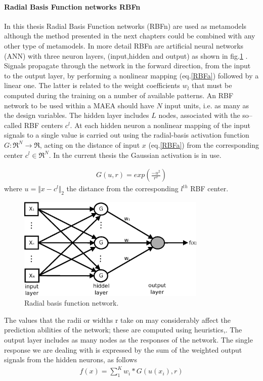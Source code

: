 \paragraph{Radial Basis Function networks RBFn}
In this thesis Radial Basis Function networks (RBFn) are used as metamodels although the method presented in the next chapters could be combined with any other type of metamodels. In more detail RBFn are artificial neural networks (ANN) with three neuron layers, (input,hidden and output) as shown in fig.\ref{rbf1} \cite{Haykin}. Signals propagate through the network in the forward direction, from the input to the output layer, by performing a nonlinear mapping (eq.\ref{RBFa}) followed by a linear one. The latter is related to the weight coefficients $w_l$ that must be computed during the training on a number of available patterns. An RBF network to be used within a MAEA should have $N$ input units, i.e. as many as the  design variables. The hidden layer includes $L$ nodes, associated with the so–called RBF centers $c^l$. At each hidden neuron a nonlinear mapping of the input signals to a single value is carried out using the radial-basis activation function $G:\Re^N \rightarrow \Re$, acting on the distance of input $x$ (eq.\ref{RBFa}) from the corresponding center $c^l \in \Re^N$.  In the current thesis the Gaussian activation is in use. 

\begin{eqnarray}
	G(u,r)=exp(\frac{-u^2}{r^2})
	\label{RBFa}
\end{eqnarray}  
where $u=\Vert x-c^l \Vert_2$ the distance from the corresponding $l^{th}$ RBF center.

\begin{figure}[h!]
\centering
\includegraphics[width=90mm]{RBF.eps} 
\caption{Radial basis function network.}
\label{rbf1}
\end{figure}
The values that the radii or widths r take on may considerably affect the prediction abilities of the network; these are computed using heuristics,\cite{Haykin}. The output layer includes as many nodes as the responses of the network. The single response we are dealing with is expressed by the sum of the weighted output signals from the hidden neurons, as follows             
\begin{eqnarray}
	f(x)=\sum _1^K w_i*G(u(x_i),r)
\label{response}
\end{eqnarray}  

